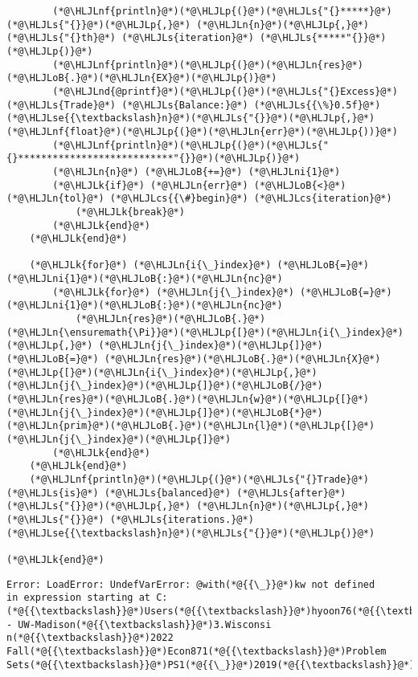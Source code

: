 \documentclass[12pt,a4paper]{article}
\newcommand{\HLJLk}[1]{\textcolor[RGB]{148,91,176}{\textbf{#1}}}
\newcommand{\HLJLn}[1]{#1}
\newcommand{\HLJLnd}[1]{\textcolor[RGB]{214,102,97}{#1}}
\newcommand{\HLJLnf}[1]{\textcolor[RGB]{66,102,213}{#1}}
\newcommand{\HLJLs}[1]{\textcolor[RGB]{201,61,57}{#1}}
\newcommand{\HLJLse}[1]{\textcolor[RGB]{59,151,46}{#1}}
\newcommand{\HLJLni}[1]{\textcolor[RGB]{59,151,46}{#1}}
\newcommand{\HLJLoB}[1]{\textcolor[RGB]{102,102,102}{\textbf{#1}}}
\newcommand{\HLJLp}[1]{#1}
\newcommand{\HLJLcs}[1]{\textcolor[RGB]{153,153,119}{\textit{#1}}}
\begin{document}
\begin{lstlisting}
        (*@\HLJLnf{println}@*)(*@\HLJLp{(}@*)(*@\HLJLs{"{}*****}@*) (*@\HLJLs{"{}}@*)(*@\HLJLp{,}@*) (*@\HLJLn{n}@*)(*@\HLJLp{,}@*) (*@\HLJLs{"{}th}@*) (*@\HLJLs{iteration}@*) (*@\HLJLs{*****"{}}@*)(*@\HLJLp{)}@*)
        (*@\HLJLnf{println}@*)(*@\HLJLp{(}@*)(*@\HLJLn{res}@*)(*@\HLJLoB{.}@*)(*@\HLJLn{EX}@*)(*@\HLJLp{)}@*)
        (*@\HLJLnd{@printf}@*)(*@\HLJLp{(}@*)(*@\HLJLs{"{}Excess}@*) (*@\HLJLs{Trade}@*) (*@\HLJLs{Balance:}@*) (*@\HLJLs{{\%}0.5f}@*) (*@\HLJLse{{\textbackslash}n}@*)(*@\HLJLs{"{}}@*)(*@\HLJLp{,}@*) (*@\HLJLnf{float}@*)(*@\HLJLp{(}@*)(*@\HLJLn{err}@*)(*@\HLJLp{))}@*)
        (*@\HLJLnf{println}@*)(*@\HLJLp{(}@*)(*@\HLJLs{"{}***************************"{}}@*)(*@\HLJLp{)}@*)
        (*@\HLJLn{n}@*) (*@\HLJLoB{+=}@*) (*@\HLJLni{1}@*)
        (*@\HLJLk{if}@*) (*@\HLJLn{err}@*) (*@\HLJLoB{<}@*) (*@\HLJLn{tol}@*) (*@\HLJLcs{{\#}begin}@*) (*@\HLJLcs{iteration}@*)
            (*@\HLJLk{break}@*)
        (*@\HLJLk{end}@*)
    (*@\HLJLk{end}@*)

    (*@\HLJLk{for}@*) (*@\HLJLn{i{\_}index}@*) (*@\HLJLoB{=}@*) (*@\HLJLni{1}@*)(*@\HLJLoB{:}@*)(*@\HLJLn{nc}@*)
        (*@\HLJLk{for}@*) (*@\HLJLn{j{\_}index}@*) (*@\HLJLoB{=}@*) (*@\HLJLni{1}@*)(*@\HLJLoB{:}@*)(*@\HLJLn{nc}@*)
            (*@\HLJLn{res}@*)(*@\HLJLoB{.}@*)(*@\HLJLn{\ensuremath{\Pi}}@*)(*@\HLJLp{[}@*)(*@\HLJLn{i{\_}index}@*)(*@\HLJLp{,}@*) (*@\HLJLn{j{\_}index}@*)(*@\HLJLp{]}@*) (*@\HLJLoB{=}@*) (*@\HLJLn{res}@*)(*@\HLJLoB{.}@*)(*@\HLJLn{X}@*)(*@\HLJLp{[}@*)(*@\HLJLn{i{\_}index}@*)(*@\HLJLp{,}@*) (*@\HLJLn{j{\_}index}@*)(*@\HLJLp{]}@*)(*@\HLJLoB{/}@*)(*@\HLJLn{res}@*)(*@\HLJLoB{.}@*)(*@\HLJLn{w}@*)(*@\HLJLp{[}@*)(*@\HLJLn{j{\_}index}@*)(*@\HLJLp{]}@*)(*@\HLJLoB{*}@*)(*@\HLJLn{prim}@*)(*@\HLJLoB{.}@*)(*@\HLJLn{l}@*)(*@\HLJLp{[}@*)(*@\HLJLn{j{\_}index}@*)(*@\HLJLp{]}@*)
        (*@\HLJLk{end}@*)
    (*@\HLJLk{end}@*)
    (*@\HLJLnf{println}@*)(*@\HLJLp{(}@*)(*@\HLJLs{"{}Trade}@*) (*@\HLJLs{is}@*) (*@\HLJLs{balanced}@*) (*@\HLJLs{after}@*) (*@\HLJLs{"{}}@*)(*@\HLJLp{,}@*) (*@\HLJLn{n}@*)(*@\HLJLp{,}@*) (*@\HLJLs{"{}}@*) (*@\HLJLs{iterations.}@*)(*@\HLJLse{{\textbackslash}n}@*)(*@\HLJLs{"{}}@*)(*@\HLJLp{)}@*)

(*@\HLJLk{end}@*)
\end{lstlisting}

\begin{lstlisting}
Error: LoadError: UndefVarError: @with(*@{{\_}}@*)kw not defined
in expression starting at C:(*@{{\textbackslash}}@*)Users(*@{{\textbackslash}}@*)hyoon76(*@{{\textbackslash}}@*)OneDrive - UW-Madison(*@{{\textbackslash}}@*)3.Wisconsi
n(*@{{\textbackslash}}@*)2022 Fall(*@{{\textbackslash}}@*)Econ871(*@{{\textbackslash}}@*)Problem Sets(*@{{\textbackslash}}@*)PS1(*@{{\_}}@*)2019(*@{{\textbackslash}}@*)ps1(*@{{\_}}@*)2019(*@{{\_}}@*)model(*@{{\_}}@*)hj.jl:9
\end{lstlisting}
\end{document}
